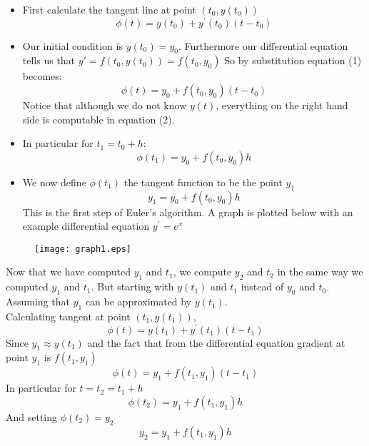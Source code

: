 \documentclass[11pt,a4paper]{amsart}
\begin{document}
	\begin{itemize}
		\item First calculate the tangent line at point $(t_0, y(t_0))$
			\begin{equation}
				\phi(t) = y(t_0) + y^{'}(t_0)(t-t_0)
			\end{equation}
		\item Our initial condition is $y(t_0) = y_0$. Furthermore our differential equation tells us that $\displaystyle y' = f(t_0, y(t_0)) = f(t_0, y_0)$
		So by substitution equation (1) becomes:
			\begin{equation}
				\phi(t) = y_0 + f(t_0, y_0)(t-t_0)
			\end{equation}
		Notice that although we do not know $y(t)$, everything on the right hand side is computable in equation (2).
		\vspace{2px}
		\item In particular for $t_1 = t_0 + h$:
			\begin{equation}
				\phi(t_1) = y_0 + f(t_0, y_0)h
			\end{equation}
		\item We now define $\phi(t_1)$ the tangent function to be the point $y_1$
			\begin{equation}
				y_1 = y_0 + f(t_0, y_0)h
			\end{equation}
		This is the first step of Euler's algorithm. A graph is plotted below with an example differential equation $y^{'} = e^x$
	\end{itemize}
	\begin{figure}[h]
		\texttt{[image: graph1.eps]}
	\end{figure}
	
	Now that we have computed $y_1$ and $t_1$, we compute $y_2$ and $t_2$ in the same way we computed $y_1$ and $t_1$. But starting with $y(t_1)$ and $t_1$ instead of $y_0$ and $t_0$. Assuming that $y_1$ can be approximated by $y(t_1)$.\\ 
	Calculating tangent at point $(t_1, y(t_1))$,
	\begin{equation}
		\phi(t) = y(t_1) + y^{'}(t_1)(t-t_1)
	\end{equation}
	Since $y_1 \approx y(t_1)$ and the fact that from the differential equation gradient at point $y_1$ is $f(t_1, y_1)$
	\begin{equation}
		\phi(t) = y_1 + f(t_1, y_1)(t-t_1)
	\end{equation}
	In particular for $t = t_2 = t_1 + h$
	\begin{equation}
		\phi(t_2) = y_1 + f(t_1, y_1)h
	\end{equation}
	And setting $\phi(t_2) = y_2$
	\begin{equation}
		y_2 = y_1 + f(t_1, y_1)h
	\end{equation}
\end{document}
